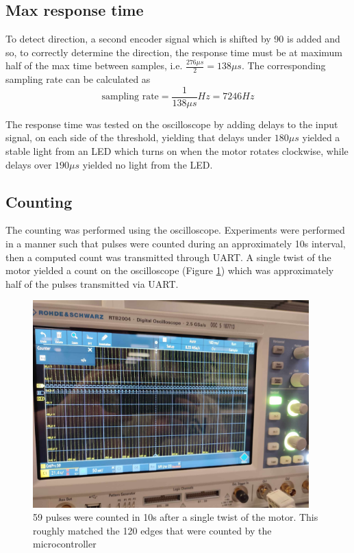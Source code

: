 \documentclass{article}
\begin{document}
\subsection*{Max response time}
To detect direction, a second encoder signal which is shifted by 90\textdegree{} is added
and so, to correctly determine the direction, the response time must be at maximum half of
the max time between samples, i.e. $\frac{276\mu s}{2} = 138\mu s$. The corresponding
sampling rate can be calculated as \[
	\text{sampling rate} = \frac{1}{138\mu s}Hz = 7246Hz
\]

The response time was tested on the oscilloscope by adding delays to the input signal,
on each side of the threshold, yielding that delays under $180\mu s$ yielded a stable
light from an LED which turns on when the motor rotates clockwise, while delays over
$190\mu s$ yielded no light from the LED.


\subsection*{Counting}
The counting was performed using the oscilloscope. Experiments were performed in a manner
such that pulses were counted during an approximately 10s interval, then a computed count
was transmitted through UART. A single twist of the motor yielded a count on the
oscilloscope (Figure \ref{fig:osc}) which was approximately half of the pulses transmitted via UART.

\begin{figure}[h]
	\begin{center}
		\includegraphics[width=0.95\textwidth]{./oscilloscope.jpeg}
	\end{center}
	\caption{59 pulses were counted in 10s after a single twist of the motor. This roughly
		matched the 120 edges that were counted by the microcontroller}\label{fig:osc}
\end{figure}
\end{document}
